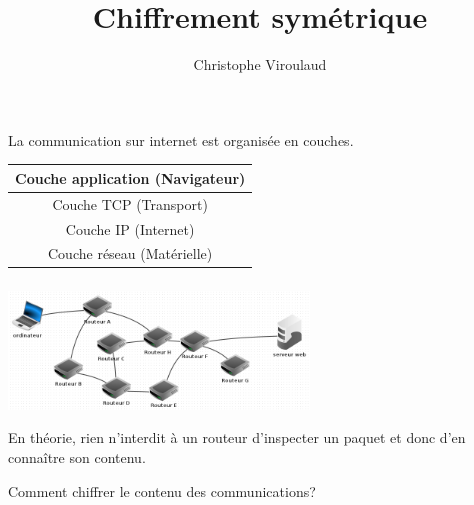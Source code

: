\documentclass[svgnames,11pt]{beamer}
\author[]{Christophe Viroulaud}
\title{Chiffrement symétrique}
\date{\framebox{\textbf{Archi 20}}}
\institute{Terminale - NSI}
\begin{document}
\begin{frame}
    \titlepage
\end{frame}
\begin{frame}
    \frametitle{}

    La communication sur internet est organisée en couches.
    \begin{center}
        \begin{tabular}{|c|}
            \hline
            Couche application (Navigateur) \\
            \hline
            Couche TCP (Transport)          \\
            \hline
            Couche IP (Internet)            \\
            \hline
            Couche réseau (Matérielle)      \\
            \hline
        \end{tabular}
    \end{center}

\end{frame}
\begin{frame}
    \frametitle{}
    \begin{center}
        \centering
        \includegraphics[width=8cm]{ressources/serveur-web.png}
        \label{IMG}
    \end{center}
    En théorie, rien n'interdit à un routeur d'inspecter un paquet et donc d'en connaître son contenu.
    \begin{framed}
        \centering Comment chiffrer le contenu des communications?
    \end{framed}
\end{frame}
\end{document}
